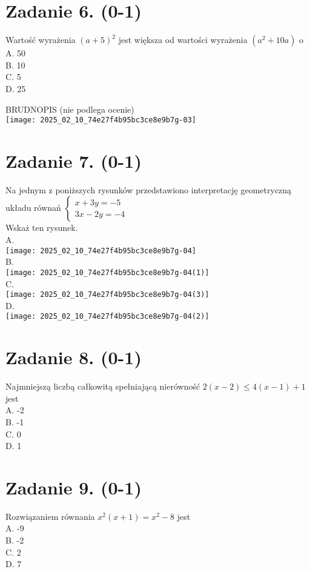 \documentclass[10pt]{article}
\begin{document}
\section*{Zadanie 6. (0-1)}
Wartość wyrażenia \((a+5)^{2}\) jest większa od wartości wyrażenia \(\left(a^{2}+10 a\right)\) o\\
A. 50\\
B. 10\\
C. 5\\
D. 25

BRUDNOPIS (nie podlega ocenie)\\
\texttt{[image: 2025\_02\_10\_74e27f4b95bc3ce8e9b7g-03]}

\section*{Zadanie 7. (0-1)}
Na jednym z poniższych rysunków przedstawiono interpretację geometryczną układu równań \(\left\{\begin{array}{l}x+3 y=-5 \\ 3 x-2 y=-4\end{array}\right.\)\\
Wskaż ten rysunek.\\
A.\\
\texttt{[image: 2025\_02\_10\_74e27f4b95bc3ce8e9b7g-04]}\\
B.\\
\texttt{[image: 2025\_02\_10\_74e27f4b95bc3ce8e9b7g-04(1)]}\\
C.\\
\texttt{[image: 2025\_02\_10\_74e27f4b95bc3ce8e9b7g-04(3)]}\\
D.\\
\texttt{[image: 2025\_02\_10\_74e27f4b95bc3ce8e9b7g-04(2)]}

\section*{Zadanie 8. (0-1)}
Najmniejszą liczbą całkowitą spełniającą nierówność \(2(x-2) \leq 4(x-1)+1\) jest\\
A. -2\\
B. -1\\
C. 0\\
D. 1

\section*{Zadanie 9. (0-1)}
Rozwiązaniem równania \(x^{2}(x+1)=x^{2}-8\) jest\\
A. -9\\
B. -2\\
C. 2\\
D. 7
\end{document}
